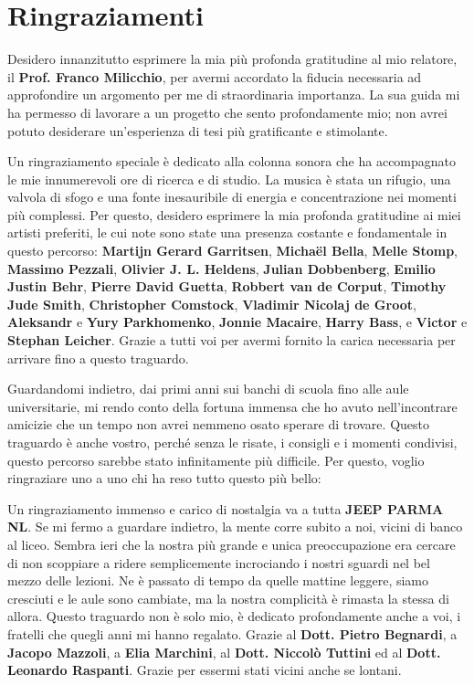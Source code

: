 \chapter*{Ringraziamenti}

Desidero innanzitutto esprimere la mia più profonda gratitudine al mio relatore, il \textbf{Prof. Franco Milicchio}, per avermi accordato la fiducia necessaria ad approfondire un argomento per me di straordinaria importanza. La sua guida mi ha permesso di lavorare a un progetto che sento profondamente mio; non avrei potuto desiderare un'esperienza di tesi più gratificante e stimolante. 

\vspace{1em}

\noindent
Un ringraziamento speciale è dedicato alla colonna sonora che ha accompagnato le mie innumerevoli ore di ricerca e di studio. La musica è stata un rifugio, una valvola di sfogo e una fonte inesauribile di energia e concentrazione nei momenti più complessi. Per questo, desidero esprimere la mia profonda gratitudine ai miei artisti preferiti, le cui note sono state una presenza costante e fondamentale in questo percorso: \textbf{Martijn Gerard Garritsen}, \textbf{Michaël Bella}, \textbf{Melle Stomp}, \textbf{Massimo Pezzali}, \textbf{Olivier J. L. Heldens}, \textbf{Julian Dobbenberg}, \textbf{Emilio Justin Behr}, \textbf{Pierre David Guetta}, \textbf{Robbert van de Corput}, \textbf{Timothy Jude Smith}, \textbf{Christopher Comstock}, \textbf{Vladimir Nicolaj de Groot}, \textbf{Aleksandr} e \textbf{Yury Parkhomenko}, \textbf{Jonnie Macaire}, \textbf{Harry Bass}, e \textbf{Victor} e \textbf{Stephan Leicher}. Grazie a tutti voi per avermi fornito la carica necessaria per arrivare fino a questo traguardo.

\vspace{1em}

\noindent
Guardandomi indietro, dai primi anni sui banchi di scuola fino alle aule universitarie, mi rendo conto della fortuna immensa che ho avuto nell'incontrare amicizie che un tempo non avrei nemmeno osato sperare di trovare. Questo traguardo è anche vostro, perché senza le risate, i consigli e i momenti condivisi, questo percorso sarebbe stato infinitamente più difficile. Per questo, voglio ringraziare uno a uno chi ha reso tutto questo più bello:

Un ringraziamento immenso e carico di nostalgia va a tutta \textbf{JEEP PARMA NL}. Se mi fermo a guardare indietro, la mente corre subito a noi, vicini di banco al liceo. Sembra ieri che la nostra più grande e unica preoccupazione era cercare di non scoppiare a ridere semplicemente incrociando i nostri sguardi nel bel mezzo delle lezioni. Ne è passato di tempo da quelle mattine leggere, siamo cresciuti e le aule sono cambiate, ma la nostra complicità è rimasta la stessa di allora. Questo traguardo non è solo mio, è dedicato profondamente anche a voi, i fratelli che quegli anni mi hanno regalato. Grazie al \textbf{Dott. Pietro Begnardi}, a \textbf{Jacopo Mazzoli}, a \textbf{Elia Marchini}, al \textbf{Dott. Niccolò Tuttini} ed al \textbf{Dott. Leonardo Raspanti}. Grazie per essermi stati vicini anche se lontani.

